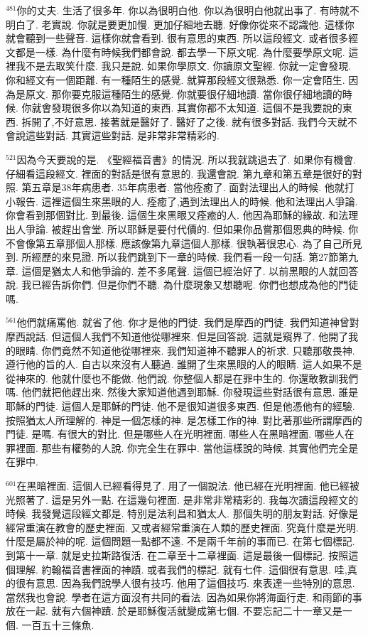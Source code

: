 \documentclass{book}
\begin{document}
$^{481}$你的丈夫.
生活了很多年.
你以為很明白他.
你以為很明白他就出事了.
有時就不明白了.
老實說.
你就是要更加慢.
更加仔細地去聽.
好像你從來不認識他.
這樣你就會聽到一些聲音.
這樣你就會看到.
很有意思的東西.
所以這段經文.
或者很多經文都是一樣.
為什麼有時候我們都會說.
都去學一下原文呢.
為什麼要學原文呢.
這裡我不是去取笑什麼.
我只是說.
如果你學原文.
你讀原文聖經.
你就一定會發現.
你和經文有一個距離.
有一種陌生的感覺.
就算那段經文很熟悉.
你一定會陌生.
因為是原文.
那你要克服這種陌生的感覺.
你就要很仔細地讀.
當你很仔細地讀的時候.
你就會發現很多你以為知道的東西.
其實你都不太知道.
這個不是我要說的東西.
拆開了,不好意思.
接著就是醫好了.
醫好了之後.
就有很多對話.
我們今天就不會說這些對話.
其實這些對話.
是非常非常精彩的.

$^{521}$因為今天要說的是.
《聖經福音書》的情況.
所以我就跳過去了.
如果你有機會.
仔細看這段經文.
裡面的對話是很有意思的.
我還會說.
第九章和第五章是很好的對照.
第五章是38年病患者.
35年病患者.
當他痊癒了.
面對法理出人的時候.
他就打小報告.
這裡這個生來黑眼的人.
痊癒了,遇到法理出人的時候.
他和法理出人爭論.
你會看到那個對比.
到最後.
這個生來黑眼又痊癒的人.
他因為耶穌的緣故.
和法理出人爭論.
被趕出會堂.
所以耶穌是要付代價的.
但如果你品嘗那個恩典的時候.
你不會像第五章那個人那樣.
應該像第九章這個人那樣.
很執著很忠心.
為了自己所見到.
所經歷的來見證.
所以我們跳到下一章的時候.
我們看一段一句話.
第27節第九章.
這個是猶太人和他爭論的.
差不多尾聲.
這個已經治好了.
以前黑眼的人就回答說.
我已經告訴你們.
但是你們不聽.
為什麼現象又想聽呢.
你們也想成為他的門徒嗎.

$^{561}$他們就痛罵他.
就省了他.
你才是他的門徒.
我們是摩西的門徒.
我們知道神曾對摩西說話.
但這個人我們不知道他從哪裡來.
但是回答說.
這就是窺界了.
他開了我的眼睛.
你們竟然不知道他從哪裡來.
我們知道神不聽罪人的祈求.
只聽那敬畏神.
遵行他的旨的人.
自古以來沒有人聽過.
誰開了生來黑眼的人的眼睛.
這人如果不是從神來的.
他就什麼也不能做.
他們說.
你整個人都是在罪中生的.
你還敢教訓我們嗎.
他們就把他趕出來.
然後大家知道他遇到耶穌.
你發現這些對話很有意思.
誰是耶穌的門徒.
這個人是耶穌的門徒.
他不是很知道很多東西.
但是他憑他有的經驗.
按照猶太人所理解的.
神是一個怎樣的神.
是怎樣工作的神.
對比著那些所謂摩西的門徒.
是嗎.
有很大的對比.
但是哪些人在光明裡面.
哪些人在黑暗裡面.
哪些人在罪裡面.
那些有權勢的人說.
你完全生在罪中.
當他這樣說的時候.
其實他們完全是在罪中.

$^{601}$在黑暗裡面.
這個人已經看得見了.
用了一個說法.
他已經在光明裡面.
他已經被光照著了.
這是另外一點.
在這幾句裡面.
是非常非常精彩的.
我每次讀這段經文的時候.
我發覺這段經文都是.
特別是法利昌和猶太人.
那個失明的朋友對話.
好像是經常重演在教會的歷史裡面.
又或者經常重演在人類的歷史裡面.
究竟什麼是光明.
什麼是屬於神的呢.
這個問題一點都不遠.
不是兩千年前的事而已.
在第七個標記.
到第十一章.
就是史拉斯路復活.
在二章至十二章裡面.
這是最後一個標記.
按照這個理解.
約翰福音書裡面的神蹟.
或者我們的標記.
就有七件.
這個很有意思.
哇,真的很有意思.
因為我們說學人很有技巧.
他用了這個技巧.
來表達一些特別的意思.
當然我也會說.
學者在這方面沒有共同的看法.
因為如果你將海面行走.
和雨節的事放在一起.
就有六個神蹟.
於是耶穌復活就變成第七個.
不要忘記二十一章又是一個.
一百五十三條魚.
\end{document}
